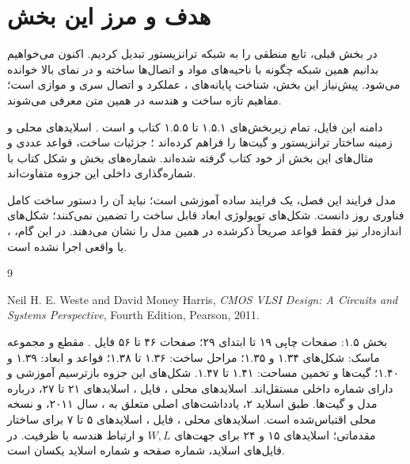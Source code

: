 \documentclass[12pt,a4paper]{article}
\newcommand{\secnum}[1]{\mbox{\beginL#1\endL}}
\begin{document}
\MakeAssignmentCover
\section*{هدف و مرز این بخش}
در بخش قبلی، تابع منطقی را به شبکه ترانزیستور تبدیل کردیم.
اکنون می‌خواهیم بدانیم همین شبکه چگونه با ناحیه‌های مواد و اتصال‌ها ساخته و
در نمای بالا خوانده می‌شود. پیش‌نیاز این بخش، شناخت پایانه‌های ،
عملکرد  و اتصال سری و موازی است؛ مفاهیم تازه ساخت و هندسه
در همین متن معرفی می‌شوند.

دامنه این فایل، تمام زیربخش‌های \secnum{۱.۵.۱} تا \secnum{۱.۵.۵} کتاب
 و  است \cite{weste}.
اسلایدهای محلی  و  زمینه ساختار ترانزیستور و گیت‌ها را فراهم کرده‌اند
\cite{intro,mos}؛ جزئیات ساخت، قواعد عددی و مثال‌های این بخش از خود کتاب گرفته شده‌اند.
شماره‌های بخش و شکل کتاب با شماره‌گذاری داخلی این جزوه متفاوت‌اند.

مدل فرایند این فصل، یک فرایند ساده آموزشی  است؛
نباید آن را دستور ساخت کامل فناوری روز دانست.
شکل‌های توپولوژی ابعاد قابل ساخت را تضمین نمی‌کنند؛ شکل‌های اندازه‌دار نیز
فقط قواعد صریحاً ذکرشده در همین مدل را نشان می‌دهند.
در این گام، ،  یا
 واقعی اجرا نشده است.

\tableofcontents
\clearpage



\begin{thebibliography}{9}
\begin{latin}
Neil H. E. Weste and David Money Harris,
\textit{CMOS VLSI Design: A Circuits and Systems Perspective},
Fourth Edition, Pearson, 2011.
\end{latin}
بخش \secnum{۱.۵}: صفحات چاپی ۱۹ تا ابتدای ۲۹؛ صفحات ۴۶ تا ۵۶ فایل .
مقطع و مجموعه ماسک: شکل‌های \secnum{۱.۳۴} و \secnum{۱.۳۵}؛
مراحل ساخت: \secnum{۱.۳۶} تا \secnum{۱.۳۸}؛ قواعد و ابعاد:
\secnum{۱.۳۹} و \secnum{۱.۴۰}؛ گیت‌ها و تخمین مساحت:
\secnum{۱.۴۱} تا \secnum{۱.۴۷}.
شکل‌های این جزوه بازترسیم آموزشی و دارای شماره داخلی مستقل‌اند.
اسلایدهای محلی ، فایل ،
اسلایدهای ۲۱ تا ۲۷، درباره مدل  و گیت‌ها.
طبق اسلاید ۲، یادداشت‌های اصلی متعلق به ، سال ۲۰۱۱،
و نسخه محلی اقتباس‌شده است.
اسلایدهای محلی ، فایل ،
اسلایدهای ۵ تا ۷ برای ساختار مقدماتی؛ اسلایدهای ۱۵ و ۲۴ برای
جهت‌های \(W,L\) و ارتباط هندسه با ظرفیت.
در فایل‌های اسلاید، شماره صفحه و شماره اسلاید یکسان است.
\end{thebibliography}
\end{document}
